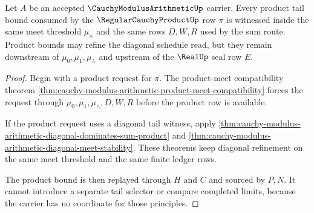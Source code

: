 \begin{theorem}
\label{thm:cauchy-modulus-arithmetic-product-tail-bound}
Let $A$ be an accepted $\CauchyModulusArithmeticUp$ carrier. Every product
tail bound consumed by the $\RegularCauchyProductUp$ row $\pi$ is witnessed
inside the same meet threshold $\mu_{\wedge}$ and the same rows $D,W,R$ used
by the sum route. Product bounds may refine the diagonal schedule read, but
they remain downstream of $\mu_0,\mu_1,\mu_{\wedge}$ and upstream of the
$\RealUp$ seal row $E$.
\end{theorem}
\begin{proof}
Begin with a product request for $\pi$. The product-meet compatibility theorem
\autoref{thm:cauchy-modulus-arithmetic-product-meet-compatibility} forces the
request through $\mu_0,\mu_1,\mu_{\wedge},D,W,R$ before the product row is
available.

If the product request uses a diagonal tail witness, apply
\autoref{thm:cauchy-modulus-arithmetic-diagonal-dominates-sum-product} and
\autoref{thm:cauchy-modulus-arithmetic-diagonal-meet-stability}. These
theorems keep diagonal refinement on the same meet threshold and the same
finite ledger rows.

The product bound is then replayed through $H$ and $C$ and sourced by $P,N$.
It cannot introduce a separate tail selector or compare completed limits,
because the carrier has no coordinate for those principles.
\end{proof}


